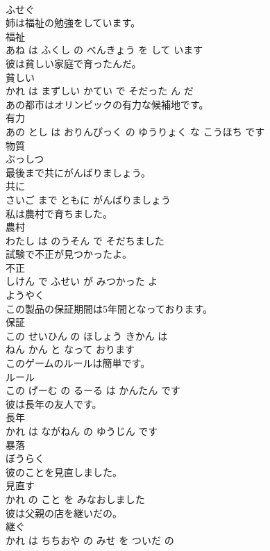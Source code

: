 \documentclass[8pt]{extreport}
\begin{document}
\begin{CJK}{UTF8}{min}
\\	ふせぐ		
\\	姉は福祉の勉強をしています。	
\\	福祉 
\\	あね は ふくし の べんきょう を して います			
\\	彼は貧しい家庭で育ったんだ。	
\\	貧しい 
\\	かれ は まずしい かてい で そだった ん だ			
\\	あの都市はオリンピックの有力な候補地です。	
\\	有力 
\\	あの とし は おりんぴっく の ゆうりょく な こうほち です			
\\	物質	
\\	ぶっしつ		
\\	最後まで共にがんばりましょう。	
\\	共に 
\\	さいご まで ともに がんばりましょう			
\\	私は農村で育ちました。	
\\	農村 
\\	わたし は のうそん で そだちました			
\\	試験で不正が見つかったよ。	
\\	不正 
\\	しけん で ふせい が みつかった よ			
\\	ようやく	
\\	この製品の保証期間は5年間となっております。	
\\	保証 
\\	この せいひん の ほしょう きかん は 
\\	ねん かん と なって おります			
\\	このゲームのルールは簡単です。	
\\	ルール 
\\	この げーむ の るーる は かんたん です			
\\	彼は長年の友人です。	
\\	長年 
\\	かれ は ながねん の ゆうじん です			
\\	暴落	
\\	ぼうらく		
\\	彼のことを見直しました。	
\\	見直す 
\\	かれ の こと を みなおしました			
\\	彼は父親の店を継いだの。	
\\	継ぐ 
\\	かれ は ちちおや の みせ を ついだ の			

\end{CJK}
\end{document}

